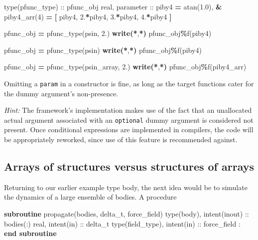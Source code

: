 \documentclass[
  paper=a4,
  ,captions=tableheading
]{scrartcl}
\newenvironment{Shaded}{\begin{snugshade}}{\end{snugshade}}
\newcommand{\BuiltInTok}[1]{#1}
\newcommand{\DataTypeTok}[1]{\textcolor[rgb]{0.13,0.29,0.53}{#1}}
\newcommand{\DecValTok}[1]{\textcolor[rgb]{0.00,0.00,0.81}{#1}}
\newcommand{\FloatTok}[1]{\textcolor[rgb]{0.00,0.00,0.81}{#1}}
\newcommand{\FunctionTok}[1]{\textcolor[rgb]{0.13,0.29,0.53}{\textbf{#1}}}
\newcommand{\KeywordTok}[1]{\textcolor[rgb]{0.13,0.29,0.53}{\textbf{#1}}}
\newcommand{\NormalTok}[1]{#1}
\newcommand{\OperatorTok}[1]{\textcolor[rgb]{0.81,0.36,0.00}{\textbf{#1}}}
\begin{document}
\begin{Shaded}
\begin{Highlighting}[]
\DataTypeTok{type(pfunc\_type)} \DataTypeTok{::}\NormalTok{ pfunc\_obj}
\DataTypeTok{real}\NormalTok{, }\DataTypeTok{parameter} \DataTypeTok{::}\NormalTok{ piby4 }\KeywordTok{=} \BuiltInTok{atan}\NormalTok{(}\FloatTok{1.0}\NormalTok{), }\KeywordTok{\&}
\NormalTok{  piby4\_arr(}\DecValTok{4}\NormalTok{) }\KeywordTok{=} \KeywordTok{[}\NormalTok{ piby4, }\FloatTok{2.}\KeywordTok{*}\NormalTok{piby4, }\FloatTok{3.}\KeywordTok{*}\NormalTok{piby4, }\FloatTok{4.}\KeywordTok{*}\NormalTok{piby4 }\KeywordTok{]}

\NormalTok{pfunc\_obj }\KeywordTok{=}\NormalTok{ pfunc\_type(psin, }\FloatTok{2.}\NormalTok{)}
\FunctionTok{write(*}\NormalTok{,}\FunctionTok{*)}\NormalTok{ pfunc\_obj}\OperatorTok{\%}\NormalTok{f(piby4)}

\NormalTok{pfunc\_obj }\KeywordTok{=}\NormalTok{ pfunc\_type(psin)}
\FunctionTok{write(*}\NormalTok{,}\FunctionTok{*)}\NormalTok{ pfunc\_obj}\OperatorTok{\%}\NormalTok{f(piby4)}

\NormalTok{pfunc\_obj }\KeywordTok{=}\NormalTok{ pfunc\_type(psin\_array, }\FloatTok{2.}\NormalTok{)}
\FunctionTok{write(*}\NormalTok{,}\FunctionTok{*)}\NormalTok{ pfunc\_obj}\OperatorTok{\%}\NormalTok{f(piby4\_arr)}
\end{Highlighting}
\end{Shaded}

Omitting a \texttt{param} in a constructor is fine, as long as the
target functions cater for the dummy argument's non-presence.

\emph{Hint:} The framework's implementation makes use of the fact that
an unallocated actual argument associated with an \texttt{optional}
dummy argument is considered not present. Once conditional expressions
are implemented in compilers, the code will be appropriately reworked,
since use of this feature is recommended against.

\subsection{Arrays of structures versus structures of
arrays}\label{arrays-of-structures-versus-structures-of-arrays}

Returning to our earlier example type body, the next idea would be to
simulate the dynamics of a large ensemble of bodies. A procedure

\begin{Shaded}
\begin{Highlighting}[]
\KeywordTok{subroutine}\NormalTok{ propagate(bodies, delta\_t, force\_field)}
  \DataTypeTok{type(body)}\NormalTok{, }\DataTypeTok{intent(inout)} \DataTypeTok{::}\NormalTok{ bodies(:)}
  \DataTypeTok{real}\NormalTok{, }\DataTypeTok{intent(in)} \DataTypeTok{::}\NormalTok{ delta\_t}
  \DataTypeTok{type(field\_type)}\NormalTok{, }\DataTypeTok{intent(in)} \DataTypeTok{::}\NormalTok{ force\_field}
\NormalTok{  :}
\KeywordTok{end subroutine}
\end{Highlighting}
\end{Shaded}
\end{document}

